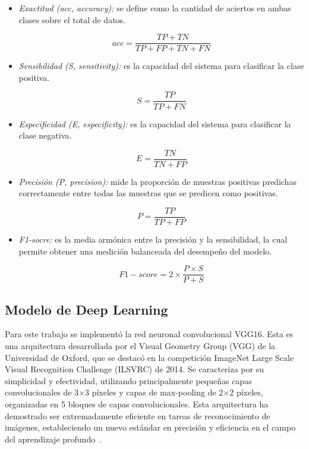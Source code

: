 \documentclass[10pt, a4paper]{article}
\begin{document}
\begin{itemize}
    \item \textit{Exactitud (acc, accuracy):} se define como la cantidad de aciertos en ambas clases sobre el total de datos.

    \begin{equation}
        acc = \frac{TP + TN}{TP + FP + TN + FN}
    \end{equation}

    \item \textit{Sensibilidad (S, sensitivity):} es la capacidad del sistema para clasificar la clase positiva.
    
    \begin{equation}
        S = \frac{TP}{TP+FN}
    \end{equation}

    \item \textit{Especificidad (E, especificity):} es la capacidad del sistema para clasificar la clase negativa.
    
    \begin{equation}
        E = \frac{TN}{TN+FP}
    \end{equation}

    \item \textit{Precisión (P, precision):} mide la proporción de muestras positivas predichas correctamente entre todas las muestras que se predicen como positivas.

    \begin{equation}
        P = \frac{TP}{TP+FP}
    \end{equation}

    \item \textit{F1-socre:} es la media armónica entre la precisión y la sensibilidad, la cual permite obtener una medición balanceada del desempeño del modelo.

    \begin{equation}
        F1-score = 2 \times \frac{P \times S}{P+S}
    \end{equation}
    
\end{itemize}

\subsection*{Modelo de Deep Learning}

Para este trabajo se implementó la red neuronal convolucional VGG16. Esta es una arquitectura 
desarrollada por el Visual Geometry Group (VGG) de la Universidad de Oxford, que se destacó 
en la competición ImageNet Large Scale Visual Recognition Challenge (ILSVRC) de 2014. Se 
caracteriza por su simplicidad y efectividad, utilizando principalmente pequeñas capas 
convolucionales de 3$\times$3 píxeles y capas de max-pooling de 2$\times$2 píxeles, organizadas en 5 bloques 
de capas convolucionales. Esta arquitectura ha demostrado ser 
extremadamente eficiente en tareas de reconocimiento de imágenes, estableciendo un nuevo 
estándar en precisión y eficiencia en el campo del aprendizaje profundo~\cite{ref9}.
\end{document}

